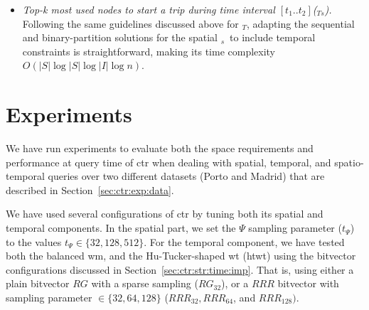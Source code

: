 \begin{itemize}
\begin{itemize}
	\end{itemize}


	\item {\em Top-k most used nodes to start a trip during time interval $[t_1..t_2]$(\topK$_{Ts}$).}
	Following the same guidelines discussed above for \topK$_T$, adapting the  sequential and 
	binary-partition solutions for the spatial \topK$_s$\ to include temporal constraints is straightforward, making its time complexity $O(|S|\log|S|\log|I|\log n)$.
	\end{itemize}


\section{Experiments}
\label{sec:ctr:exp}
	We have run experiments to evaluate both the space requirements and performance at query time of \gls{ctr}
	when dealing with spatial, temporal, and spatio-temporal queries over two different datasets 
	(Porto and Madrid) that are described in Section~\ref{sec:ctr:exp:data}. 

	We have used several configurations of \gls{ctr} by tuning both its
	spatial and temporal components. In the spatial part, %
	we set the  $\Psi$ sampling parameter ($t_{\Psi}$) to the values $t_{\Psi} \in \{32, 128, 512\}$. 
	For the temporal component, %
	we have tested both the 
	balanced \gls{wm}, and the Hu-Tucker-shaped \gls{wt} (\gls{htwt}) using the bitvector configurations
	discussed in Section~\ref{sec:ctr:str:time:imp}. That is, using either a plain bitvector $RG$ with a 
	sparse sampling ($RG_{32}$), or a $RRR$ bitvector with sampling parameter $\in \{32,64,128\}$ 
	($RRR_{32}, RRR_{64}$, and $ RRR_{128})$.


